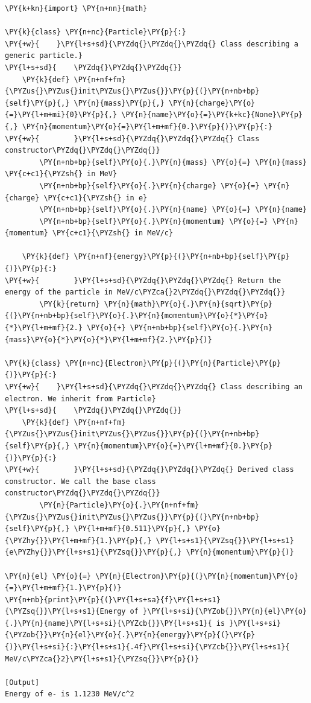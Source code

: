 \begin{Verbatim}[label=\makebox{\url{https://github.com/lucabaldini/cmepda/tree/master/slides/latex/snippets/inheritance.py}},commandchars=\\\{\}]
\PY{k+kn}{import} \PY{n+nn}{math}

\PY{k}{class} \PY{n+nc}{Particle}\PY{p}{:}
\PY{+w}{    }\PY{l+s+sd}{\PYZdq{}\PYZdq{}\PYZdq{} Class describing a generic particle.}
\PY{l+s+sd}{    \PYZdq{}\PYZdq{}\PYZdq{}}
    \PY{k}{def} \PY{n+nf+fm}{\PYZus{}\PYZus{}init\PYZus{}\PYZus{}}\PY{p}{(}\PY{n+nb+bp}{self}\PY{p}{,} \PY{n}{mass}\PY{p}{,} \PY{n}{charge}\PY{o}{=}\PY{l+m+mi}{0}\PY{p}{,} \PY{n}{name}\PY{o}{=}\PY{k+kc}{None}\PY{p}{,} \PY{n}{momentum}\PY{o}{=}\PY{l+m+mf}{0.}\PY{p}{)}\PY{p}{:}
\PY{+w}{        }\PY{l+s+sd}{\PYZdq{}\PYZdq{}\PYZdq{} Class constructor\PYZdq{}\PYZdq{}\PYZdq{}}
        \PY{n+nb+bp}{self}\PY{o}{.}\PY{n}{mass} \PY{o}{=} \PY{n}{mass} \PY{c+c1}{\PYZsh{} in MeV}
        \PY{n+nb+bp}{self}\PY{o}{.}\PY{n}{charge} \PY{o}{=} \PY{n}{charge} \PY{c+c1}{\PYZsh{} in e}
        \PY{n+nb+bp}{self}\PY{o}{.}\PY{n}{name} \PY{o}{=} \PY{n}{name}
        \PY{n+nb+bp}{self}\PY{o}{.}\PY{n}{momentum} \PY{o}{=} \PY{n}{momentum} \PY{c+c1}{\PYZsh{} in MeV/c}

    \PY{k}{def} \PY{n+nf}{energy}\PY{p}{(}\PY{n+nb+bp}{self}\PY{p}{)}\PY{p}{:}
\PY{+w}{        }\PY{l+s+sd}{\PYZdq{}\PYZdq{}\PYZdq{} Return the energy of the particle in MeV/c\PYZca{}2\PYZdq{}\PYZdq{}\PYZdq{}}
        \PY{k}{return} \PY{n}{math}\PY{o}{.}\PY{n}{sqrt}\PY{p}{(}\PY{n+nb+bp}{self}\PY{o}{.}\PY{n}{momentum}\PY{o}{*}\PY{o}{*}\PY{l+m+mf}{2.} \PY{o}{+} \PY{n+nb+bp}{self}\PY{o}{.}\PY{n}{mass}\PY{o}{*}\PY{o}{*}\PY{l+m+mf}{2.}\PY{p}{)}

\PY{k}{class} \PY{n+nc}{Electron}\PY{p}{(}\PY{n}{Particle}\PY{p}{)}\PY{p}{:}
\PY{+w}{    }\PY{l+s+sd}{\PYZdq{}\PYZdq{}\PYZdq{} Class describing an electron. We inherit from Particle}
\PY{l+s+sd}{    \PYZdq{}\PYZdq{}\PYZdq{}}
    \PY{k}{def} \PY{n+nf+fm}{\PYZus{}\PYZus{}init\PYZus{}\PYZus{}}\PY{p}{(}\PY{n+nb+bp}{self}\PY{p}{,} \PY{n}{momentum}\PY{o}{=}\PY{l+m+mf}{0.}\PY{p}{)}\PY{p}{:}
\PY{+w}{        }\PY{l+s+sd}{\PYZdq{}\PYZdq{}\PYZdq{} Derived class constructor. We call the base class constructor\PYZdq{}\PYZdq{}\PYZdq{}}
        \PY{n}{Particle}\PY{o}{.}\PY{n+nf+fm}{\PYZus{}\PYZus{}init\PYZus{}\PYZus{}}\PY{p}{(}\PY{n+nb+bp}{self}\PY{p}{,} \PY{l+m+mf}{0.511}\PY{p}{,} \PY{o}{\PYZhy{}}\PY{l+m+mf}{1.}\PY{p}{,} \PY{l+s+s1}{\PYZsq{}}\PY{l+s+s1}{e\PYZhy{}}\PY{l+s+s1}{\PYZsq{}}\PY{p}{,} \PY{n}{momentum}\PY{p}{)}

\PY{n}{el} \PY{o}{=} \PY{n}{Electron}\PY{p}{(}\PY{n}{momentum}\PY{o}{=}\PY{l+m+mf}{1.}\PY{p}{)}
\PY{n+nb}{print}\PY{p}{(}\PY{l+s+sa}{f}\PY{l+s+s1}{\PYZsq{}}\PY{l+s+s1}{Energy of }\PY{l+s+si}{\PYZob{}}\PY{n}{el}\PY{o}{.}\PY{n}{name}\PY{l+s+si}{\PYZcb{}}\PY{l+s+s1}{ is }\PY{l+s+si}{\PYZob{}}\PY{n}{el}\PY{o}{.}\PY{n}{energy}\PY{p}{(}\PY{p}{)}\PY{l+s+si}{:}\PY{l+s+s1}{.4f}\PY{l+s+si}{\PYZcb{}}\PY{l+s+s1}{ MeV/c\PYZca{}2}\PY{l+s+s1}{\PYZsq{}}\PY{p}{)}

[Output]
Energy of e- is 1.1230 MeV/c^2
\end{Verbatim}